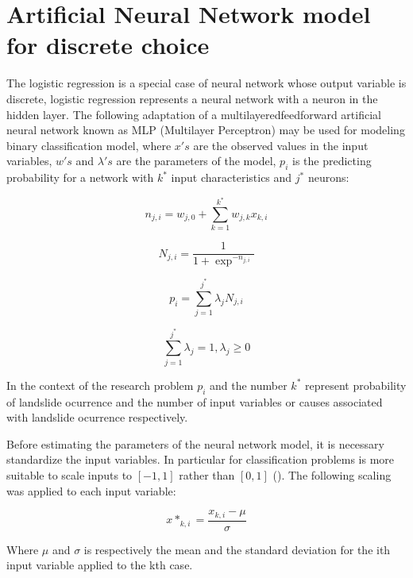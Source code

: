 \documentclass[11pt,twoside]{rmta2010esp}%
\begin{document}
\section{Artificial Neural Network model for discrete choice}
The logistic regression is a special case of neural network whose output variable is
discrete, logistic regression represents a neural network with 
a neuron in the hidden layer. The following adaptation of a multilayeredfeedforward artificial neural network known as  
MLP (Multilayer Perceptron) may be used for modeling binary classification model, where $x's$ are the observed values in the input variables, $w's$ and $\lambda's$ are the parameters of the model, $ p_{i} $ is the predicting probability for a network with $ k^{*} $ input characteristics and $ j^{*} $ neurons: 

\begin{equation}
n_{j,i} = w_{j,0} + \sum_{k=1}^{k^{*}} w_{j,k}x_{k,i}
\end{equation}

\begin{equation}
N_{j,i} = \frac{1}{1+\exp^{-n_{j,i}}}
\end{equation}



\begin{equation}
p_{i} = \sum_{j=1}^{j^{*}} \lambda_{j} N_{j,i}
\end{equation}

\begin{equation}
\sum_{j=1}^{j^{*}} \lambda_{j} = 1 , \lambda_{j} \ge 0
\end{equation}



In the context of the research problem $p_{i} $ and the number $ k^{*} $ represent 
probability of landslide ocurrence and the number of input variables or causes associated with landslide ocurrence respectively.

Before estimating the parameters of the neural network model, it is necessary standardize the input variables. In particular for classification problems is more suitable to scale inputs to $[-1,1]$ rather than $[0,1]$ (\cite{FAQANN}). The following scaling was applied to each input variable: 

\begin{equation}
x*_{k,i} = \frac{x_{k,i} - \mu }{\sigma}
\end{equation}

Where $ \mu $ and $\sigma$  is respectively the mean and the standard deviation for the ith input variable applied to the kth case.  
\end{document}
